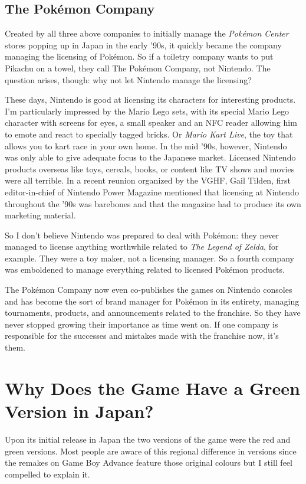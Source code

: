 \documentclass{book}
\begin{document}
\FloatBarrier\subsection*{The Pokémon Company}
Created by all three above companies to initially manage the \emph{Pokémon Center} stores popping up in Japan in the early ’90s, it quickly became the company managing the licensing of Pokémon. So if a toiletry company wants to put Pikachu on a towel, they call The Pokémon Company, not Nintendo. The question arises, though: why not let Nintendo manage the licensing?\par
These days, Nintendo is good at licensing its characters for interesting products. I’m particularly impressed by the Mario Lego sets, with its special Mario Lego character with screens for eyes, a small speaker and an NFC reader allowing him to emote and react to specially tagged bricks. Or \emph{Mario Kart Live}, the toy that allows you to kart race in your own home. In the mid ’90s, however, Nintendo was only able to give adequate focus to the Japanese market. Licensed Nintendo products overseas like toys, cereals, books, or content like TV shows and movies were all terrible. In a recent reunion organized by the VGHF, Gail Tilden, first editor-in-chief of Nintendo Power Magazine mentioned that licensing at Nintendo throughout the ’90s was barebones and that the magazine had to produce its own marketing material.\par
So I don’t believe Nintendo was prepared to deal with Pokémon: they never managed to license anything worthwhile related to \emph{The Legend of Zelda}, for example. They were a toy maker, not a licensing manager. So a fourth company was emboldened to manage everything related to licensed Pokémon products.\par
The Pokémon Company now even co-publishes the games on Nintendo consoles and has become the sort of brand manager for Pokémon in its entirety, managing tournaments, products, and announcements related to the franchise. So they have never stopped growing their importance as time went on. If one company is responsible for the successes and mistakes made with the franchise now, it’s them.\par
\FloatBarrier\section*{Why Does the Game Have a Green Version in Japan?}
Upon its initial release in Japan the two versions of the game were the red and green versions. Most people are aware of this regional difference in versions since the remakes on Game Boy Advance feature those original colours but I still feel compelled to explain it.\par
\end{document}
